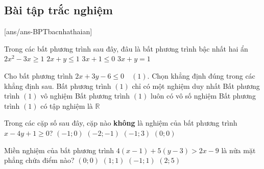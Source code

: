\subsection{Bài tập trắc nghiệm}
[ans/ans-BPTbacnhathaian]
\begin{ex}%
	Trong các bất phương trình sau đây, đâu là bất phương trình bậc nhất hai ẩn
	\choice
	{$2x^2-3x \geq 1$}
	{\True $2x+y\leq 1$}
	{$3x+1\leq 0$}
	{$3x+y=1$}
\end{ex}
\begin{ex}%
	Cho bất phương trình $2x+3y-6 \leq 0\quad (1)$. Chọn khẳng định đúng trong các khẳng định sau.
	\choice
	{Bất phương trình $(1)$ chỉ có một nghiệm duy nhất}
	{Bất phương trình $(1)$ vô nghiệm}
	{\True Bất phương trình $(1)$ luôn có vô số nghiệm}
	{Bất phương trình $(1)$ có tập nghiệm là $\mathbb{R}$}
\end{ex}
\begin{ex}%
	Trong các cặp số sau đây, cặp nào \textbf{không} là nghiệm của bất phương trình $x-4y+1 \geq 0$?
	\choice
	{$(-1;0)$}
	{$(-2;-1)$}
	{\True $(-1;3)$}
	{$(0;0)$}
\end{ex}
\begin{ex}%
	Miền nghiệm của bất phương trình $4(x-1)+5(y-3)>2x-9$ là nửa mặt phẳng chứa điểm nào?
	\choice
	{$(0;0)$}
	{$(1;1)$}
	{$(-1;1)$}
	{\True $(2;5)$}
\end{ex}
